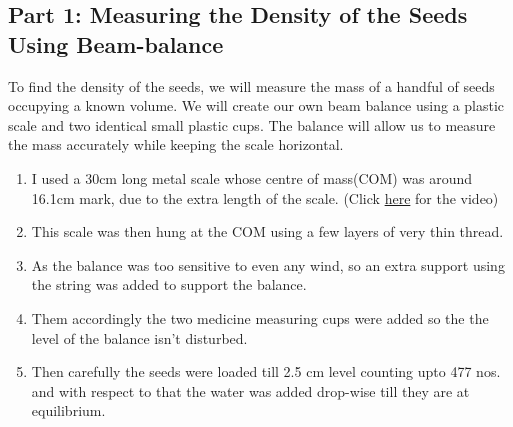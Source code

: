 \documentclass[twocolumn,11pt]{article}
\begin{document}
\subsection{Part 1: Measuring the Density of the Seeds Using Beam-balance}
To find the density of the seeds, we will measure the mass of a handful of seeds occupying a known volume. We will create our own beam balance using a plastic scale and two identical small plastic cups. The balance will allow us to measure the mass accurately while keeping the scale horizontal.
\begin{enumerate}
    \item I used a 30cm long metal scale whose centre of mass(COM) was around 16.1cm mark, due to the extra length of the scale. (Click \href{https://drive.google.com/file/d/153ypuE-LtqAybvo5taYfaOPsymXNsXfZ/view?usp=drive_link}{here} for the video)
    \item This scale was then hung at the COM using a few layers of very thin thread.
    \item As the balance was too sensitive to even any wind, so an extra support using the string was added to support the balance.
    \item Them accordingly the two medicine measuring cups were added so the the level of the balance isn't disturbed.
    \item Then carefully the seeds were loaded till 2.5 cm level counting upto 477 nos. and with respect to that the water was added drop-wise till they are at equilibrium.
\end{enumerate}
\end{document}
